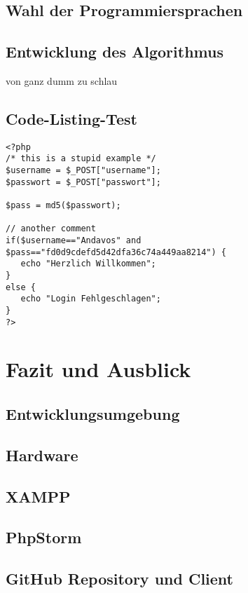 \documentclass[12pt,a4paper,titlepage]{article} %
\begin{document}
\subsection{Wahl der Programmiersprachen}
\subsection{Entwicklung des Algorithmus}
von ganz dumm zu schlau


\subsection{Code-Listing-Test}
\begin{lstlisting}
<?php
/* this is a stupid example */
$username = $_POST["username"];
$passwort = $_POST["passwort"];

$pass = md5($passwort);

// another comment
if($username=="Andavos" and
$pass=="fd0d9cdefd5d42dfa36c74a449aa8214") {
   echo "Herzlich Willkommen";
}
else {
   echo "Login Fehlgeschlagen";
}
?>
\end{lstlisting}

\clearpage
\newpage

\section{Fazit und Ausblick} %



\clearpage
\newpage
\begin{appendix}


\section{Entwicklungsumgebung}
\subsection{Hardware}
\subsection{XAMPP}
\subsection{PhpStorm}
\subsection{GitHub Repository und Client}
\end{appendix}
\end{document}
